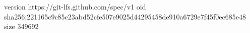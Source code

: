 version https://git-lfs.github.com/spec/v1
oid sha256:221165c9c85c23abd52cfe507e9025d44295458de910a6729e7f45f0ec685e48
size 349692
